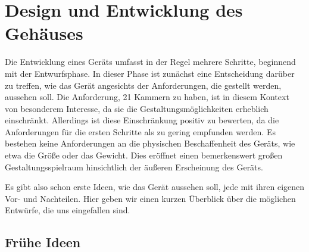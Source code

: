 \section{Design und Entwicklung des Gehäuses}
Die Entwicklung eines Geräts umfasst in der Regel mehrere Schritte, beginnend mit der Entwurfsphase. In dieser Phase ist zunächst eine Entscheidung darüber zu treffen, wie das Gerät angesichts der Anforderungen, die gestellt werden, aussehen soll. Die Anforderung, 21 Kammern zu haben, ist in diesem Kontext von besonderem Interesse, da sie die Gestaltungsmöglichkeiten erheblich einschränkt. Allerdings ist diese Einschränkung positiv zu bewerten, da die Anforderungen für die ersten Schritte als zu gering empfunden werden. Es bestehen keine Anforderungen an die physischen Beschaffenheit des Geräts, wie etwa die Größe oder das Gewicht. Dies eröffnet einen bemerkenswert großen Gestaltungsspielraum hinsichtlich der äußeren Erscheinung des Geräts.

Es gibt also schon erste Ideen, wie das Gerät aussehen soll, jede mit ihren eigenen Vor- und Nachteilen. Hier geben wir einen kurzen Überblick über die möglichen Entwürfe, die uns eingefallen sind.

\subsection{Frühe Ideen}
